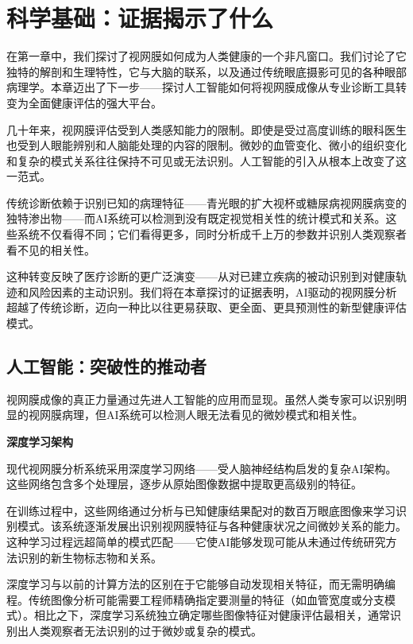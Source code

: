\documentclass[
  Letterpaper,
]{scrbook}
\begin{document}

\chapter{科学基础：证据揭示了什么}\label{ux79d1ux5b66ux57faux7840ux8bc1ux636eux63edux793aux4e86ux4ec0ux4e48}

在第一章中，我们探讨了视网膜如何成为人类健康的一个非凡窗口。我们讨论了它独特的解剖和生理特性，它与大脑的联系，以及通过传统眼底摄影可见的各种眼部病理学。本章迈出了下一步------探讨人工智能如何将视网膜成像从专业诊断工具转变为全面健康评估的强大平台。

几十年来，视网膜评估受到人类感知能力的限制。即使是受过高度训练的眼科医生也受到人眼能辨别和人脑能处理的内容的限制。微妙的血管变化、微小的组织变化和复杂的模式关系往往保持不可见或无法识别。人工智能的引入从根本上改变了这一范式。

传统诊断依赖于识别已知的病理特征------青光眼的扩大视杯或糖尿病视网膜病变的独特渗出物------而AI系统可以检测到没有既定视觉相关性的统计模式和关系。这些系统不仅看得不同；它们看得更多，同时分析成千上万的参数并识别人类观察者看不见的相关性。

这种转变反映了医疗诊断的更广泛演变------从对已建立疾病的被动识别到对健康轨迹和风险因素的主动识别。我们将在本章探讨的证据表明，AI驱动的视网膜分析超越了传统诊断，迈向一种比以往更易获取、更全面、更具预测性的新型健康评估模式。

\section{人工智能：突破性的推动者}\label{ux4ebaux5de5ux667aux80fdux7a81ux7834ux6027ux7684ux63a8ux52a8ux8005}

视网膜成像的真正力量通过先进人工智能的应用而显现。虽然人类专家可以识别明显的视网膜病理，但AI系统可以检测人眼无法看见的微妙模式和相关性。

\textbf{深度学习架构}

现代视网膜分析系统采用深度学习网络------受人脑神经结构启发的复杂AI架构。这些网络包含多个处理层，逐步从原始图像数据中提取更高级别的特征。

在训练过程中，这些网络通过分析与已知健康结果配对的数百万眼底图像来学习识别模式。该系统逐渐发展出识别视网膜特征与各种健康状况之间微妙关系的能力。这种学习过程远超简单的模式匹配------它使AI能够发现可能从未通过传统研究方法识别的新生物标志物和关系。

深度学习与以前的计算方法的区别在于它能够自动发现相关特征，而无需明确编程。传统图像分析可能需要工程师精确指定要测量的特征（如血管宽度或分支模式）。相比之下，深度学习系统独立确定哪些图像特征对健康评估最相关，通常识别出人类观察者无法识别的过于微妙或复杂的模式。
\end{document}
